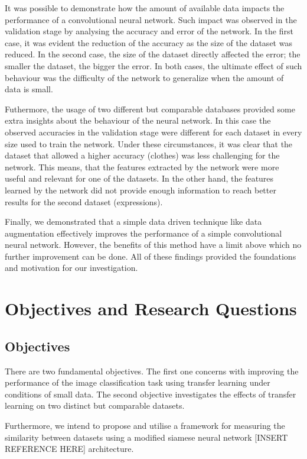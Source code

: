 \documentclass{article}
\begin{document}
It was possible to demonstrate how the amount of available data impacts the performance of a convolutional neural network. Such impact was observed in the validation stage by analysing the accuracy and error of the network. In the first case, it was evident the reduction of the accuracy as the size of the dataset was reduced. In the second case, the size of the dataset directly affected the error; the smaller the dataset, the bigger the error. In both cases, the ultimate effect of such behaviour was the difficulty of the network to generalize when the amount of data is small.

Futhermore, the usage of two different but comparable databases provided some extra insights about the behaviour of the neural network. In this case the observed accuracies in the validation stage were different for each dataset in every size used to train the network. Under these circumstances, it was clear that the dataset that allowed a higher accuracy (clothes) was less challenging for the network. This means, that the features extracted by the network were more useful and relevant for one of the datasets. In the other hand, the features learned by the network did not provide enough information to reach better results for the second dataset (expressions).

Finally, we demonstrated that a simple data driven technique like data augmentation effectively improves the performance of a simple convolutional neural network. However, the benefits of this method have a limit above which no further improvement can be done. All of these findings provided the foundations and motivation for our investigation.

\section{Objectives and Research Questions}
\label{sec:obj_questions}

\subsection{Objectives}
\label{sec:objectives}

There are two fundamental objectives. The first one concerns with improving the performance of the image classification task using transfer learning under conditions of small data. The second objective investigates the effects of transfer learning on two distinct but comparable datasets. 

Furthermore, we intend to propose and utilise a framework for measuring the similarity between datasets using a modified siamese neural network [INSERT REFERENCE HERE] architecture.
\end{document}
